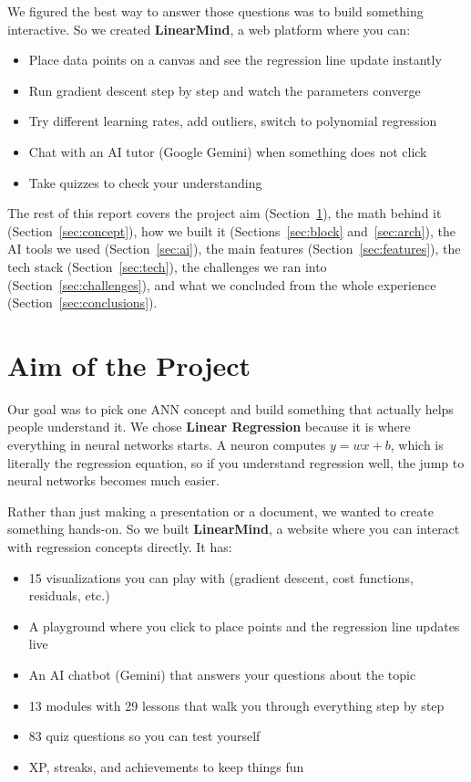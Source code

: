 \documentclass[12pt, a4paper]{article}
\begin{document}
We figured the best way to answer those questions was to build something interactive. So we created \textbf{LinearMind}, a web platform where you can:
\begin{itemize}
    \item Place data points on a canvas and see the regression line update instantly
    \item Run gradient descent step by step and watch the parameters converge
    \item Try different learning rates, add outliers, switch to polynomial regression
    \item Chat with an AI tutor (Google Gemini) when something does not click
    \item Take quizzes to check your understanding
\end{itemize}

The rest of this report covers the project aim (Section~\ref{sec:aim}), the math behind it (Section~\ref{sec:concept}), how we built it (Sections~\ref{sec:block} and~\ref{sec:arch}), the AI tools we used (Section~\ref{sec:ai}), the main features (Section~\ref{sec:features}), the tech stack (Section~\ref{sec:tech}), the challenges we ran into (Section~\ref{sec:challenges}), and what we concluded from the whole experience (Section~\ref{sec:conclusions}).

\section{Aim of the Project}
\label{sec:aim}

Our goal was to pick one ANN concept and build something that actually helps people understand it. We chose \textbf{Linear Regression} because it is where everything in neural networks starts. A neuron computes $y = wx + b$, which is literally the regression equation, so if you understand regression well, the jump to neural networks becomes much easier.

Rather than just making a presentation or a document, we wanted to create something hands-on. So we built \textbf{LinearMind}, a website where you can interact with regression concepts directly. It has:
\begin{itemize}
    \item 15 visualizations you can play with (gradient descent, cost functions, residuals, etc.)
    \item A playground where you click to place points and the regression line updates live
    \item An AI chatbot (Gemini) that answers your questions about the topic
    \item 13 modules with 29 lessons that walk you through everything step by step
    \item 83 quiz questions so you can test yourself
    \item XP, streaks, and achievements to keep things fun
\end{itemize}
\end{document}
